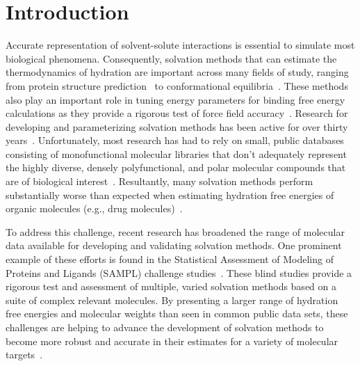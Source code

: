 \documentclass[12pt]{article}
\newcommand{\+}[1]{\ensuremath{\mathbf{#1}}}
\begin{document}
\newpage


\section{Introduction}
\label{Introduction}
Accurate representation of solvent-solute interactions is essential to simulate most biological phenomena. Consequently, solvation methods that can estimate the thermodynamics of hydration are important across many fields of study, ranging from protein structure prediction~\cite{Levy:03,Robinson:99,Rakhmanov:07} to conformational equilibria~\cite{Jorgensen:2004, Cui:2002, Ashbaugh:99,Ashbaugh:2002}. These methods also play an important role in tuning energy parameters for binding free energy calculations as they provide a rigorous test of force field accuracy~\cite{Yang:2009,Whalen:2013,Mobley:2009}.  Research for developing and parameterizing solvation methods has been active for over thirty years~\cite{Eisenberg:1986,Kang:1987:1,Kang:1987:2,Kang:1987:3,Kang:1987:4,Tan:2006,Gallicchio:2002}. Unfortunately, most research has had to rely on small, public databases consisting of monofunctional molecular libraries that don't adequately represent the highly diverse, densely polyfunctional, and polar molecular compounds that are of biological interest~\cite{Mobley:2009c,Mobley:2007,Shivakumar:2010,Li:1999}. Resultantly, many solvation methods perform substantially worse than expected when estimating hydration free energies of organic molecules (e.g., drug molecules)~\cite{Nicholls:2008,Klimovich:2010,Mobley:2009b}. 
 
To address this challenge, recent research has broadened the range of molecular data available for developing and validating solvation methods. One prominent example of these efforts is found in the Statistical Assessment of Modeling of Proteins and Ligands (SAMPL) challenge studies~\cite{Nicholls:2008, Mobley:2009b, Klimovich:2010, Mobley:2009, Geballe:2012, Geballe:2010,Mobley:2014}.  These blind studies provide a rigorous test and assessment of multiple, varied solvation methods based on a suite of complex relevant molecules.  By presenting a larger range of hydration free energies and molecular weights than seen in common public data sets, these challenges are helping to advance the development of solvation methods to become more robust and accurate in their estimates for a variety of molecular targets~\cite{Ellingson:2014,Muddana:2014,Fu:2014}.  
\end{document}
